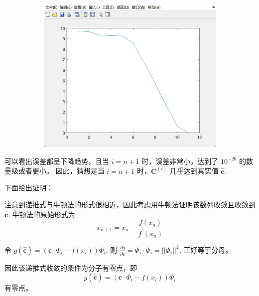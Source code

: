\documentclass[11pt]{ctexart}
\begin{document}
\begin{figure}[H]
\begin{subfigure}[t]{0.3\textwidth}
            \label{fig:b}
        \end{subfigure}
        \begin{subfigure}[t]{0.3\textwidth}
            \centering
            \includegraphics[width=\textwidth]{./picture/exp1_3_3}
        \end{subfigure}
    \end{figure}

    可以看出误差都呈下降趋势，且当 \(i=n+1\) 时，误差非常小，达到了 \(10^{-20}\) 的数量级或者更小。
    因此，猜想是当 \(i=n+1\) 时，\(\boldsymbol{C}^{(i)}\) 几乎达到真实值 \(\mathbf{\hat{c}}\).

    下面给出证明：

    注意到递推式与牛顿法的形式很相近，因此考虑用牛顿法证明该数列收敛且收敛到 \(\mathbf{\hat{c}}\).
    牛顿法的原始形式为
    \begin{equation}
        x_{n+1}=x_{n}-\frac{f\left(x_{n}\right)}{f^{\prime}\left(x_{n}\right)}
    \end{equation}

    \hspace{2em}
    令 \(g(\mathbf{\hat{c}})=(\mathbf{c}\cdot \Phi_i- f(x_i))\Phi_i\), 则
    \(\frac{\partial g}{\partial \mathbf{\hat c}} =\Phi_i \cdot \Phi_i=||\Phi_i||^2\), 正好等于分母。

    因此该递推式收敛的条件为分子有零点，即
    \begin{equation}
        g(\mathbf{\hat{c}})=(\mathbf{c}\cdot \Phi_i- f(x_i))\Phi_i \label{eq:eq1}
    \end{equation}
    有零点。
\end{document}
